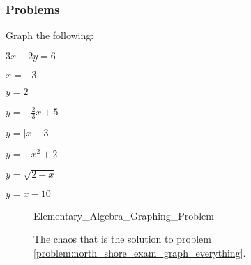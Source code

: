 \documentclass[crop=false,class=book,oneside]{standalone}
\begin{document}
        \subsubsection{Problems}
        \begin{problem}
        \label{problem:north_shore_exam_graph_everything}Graph the following:
        \begin{enumerate}
        \begin{multicols}{4}
            \item $3x-2y=6$
            \item $x=-3$
            \item $y=2$
            \item $y=-\frac{2}{3}x+5$
            \item $y=|x-3|$
            \item $y=-x^2+2$
            \item $y=\sqrt{2-x}$
            \item $y=x-10$
        \end{multicols}
        \end{enumerate}
        \end{problem}
        \begin{figure}[H]
            \centering
            \captionsetup{type=figure}
            {Elementary_Algebra_Graphing_Problem}
            \caption{The chaos that is the solution to problem
                     \ref{problem:north_shore_exam_graph_everything}.}
            \label{fig:north_shore_graphing_problem}
        \end{figure}
\end{document}
